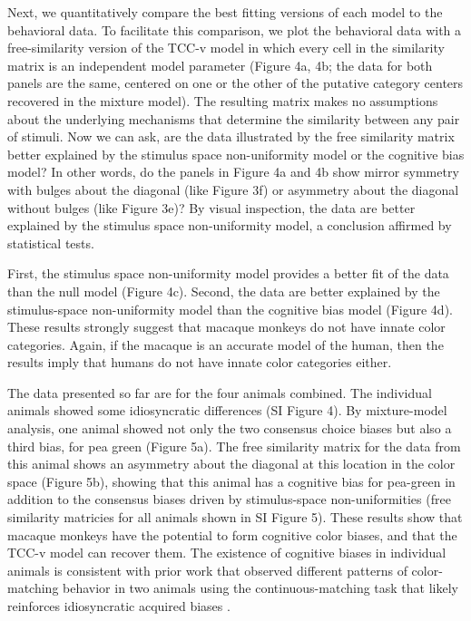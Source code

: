 Next, we quantitatively compare the best fitting versions of each model to the behavioral data. 
To facilitate this comparison, we plot the behavioral data with a free-similarity version of the TCC-v model in which every cell in the similarity matrix is an independent model parameter (Figure 4a, 4b; the data for both panels are the same, centered on one or the other of the putative category centers recovered in the mixture model). 
The resulting matrix makes no assumptions about the underlying mechanisms that determine the similarity between any pair of stimuli. 
Now we can ask, are the data illustrated by the free similarity matrix better explained by the stimulus space non-uniformity model or the cognitive bias model? 
In other words, do the panels in Figure 4a and 4b show mirror symmetry with bulges about the diagonal (like Figure 3f) or asymmetry about the diagonal without bulges (like Figure 3e)? By visual inspection, the data are better explained by the stimulus space non-uniformity model, a conclusion affirmed by statistical tests. 

First, the stimulus space non-uniformity model provides a better fit of the data than the null model (Figure 4c). 
Second, the data are better explained by the stimulus-space non-uniformity model than the cognitive bias model (Figure 4d). 
These results strongly suggest that macaque monkeys do not have innate color categories. 
Again, if the macaque is an accurate model of the human, then the results imply that humans do not have innate color categories either. 

The data presented so far are for the four animals combined. 
The individual animals showed some idiosyncratic differences (SI Figure 4).
By mixture-model analysis, one animal showed not only the two consensus choice biases but also a third bias, for pea green (Figure 5a). 
The free similarity matrix for the data from this animal shows an asymmetry about the diagonal at this location in the color space (Figure 5b), showing that this animal has a cognitive bias for pea-green in addition to the consensus biases driven by stimulus-space non-uniformities (free similarity matricies for all animals shown in SI Figure 5). 
These results show that macaque monkeys have the potential to form cognitive color biases, and that the TCC-v model can recover them. The existence of cognitive biases in individual animals is consistent with prior work that observed different patterns of color-matching behavior in two animals using the continuous-matching task that likely reinforces idiosyncratic acquired biases \citep{panichello_error-correcting_2019}.


